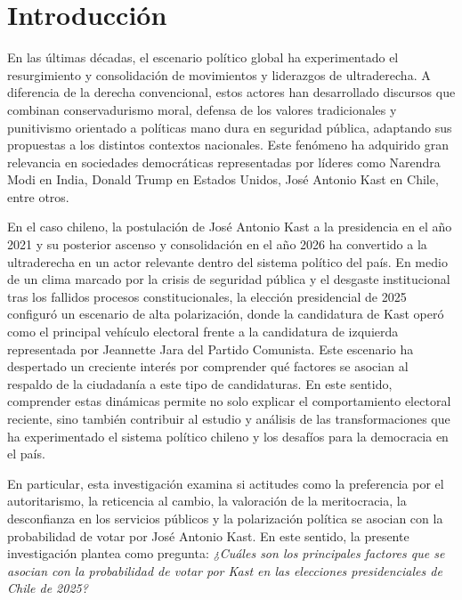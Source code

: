 \documentclass[
  spanish,
  a4paper,
  oneside]{scrbook}
\begin{document}

\chapter{Introducción}\label{introducciuxf3n}

En las últimas décadas, el escenario político global ha experimentado el
resurgimiento y consolidación de movimientos y liderazgos de
ultraderecha. A diferencia de la derecha convencional, estos actores han
desarrollado discursos que combinan conservadurismo moral, defensa de
los valores tradicionales y punitivismo orientado a políticas mano dura
en seguridad pública, adaptando sus propuestas a los distintos contextos
nacionales. Este fenómeno ha adquirido gran relevancia en sociedades
democráticas representadas por líderes como Narendra Modi en India,
Donald Trump en Estados Unidos, José Antonio Kast en Chile, entre otros.

En el caso chileno, la postulación de José Antonio Kast a la presidencia
en el año 2021 y su posterior ascenso y consolidación en el año 2026 ha
convertido a la ultraderecha en un actor relevante dentro del sistema
político del país. En medio de un clima marcado por la crisis de
seguridad pública y el desgaste institucional tras los fallidos procesos
constitucionales, la elección presidencial de 2025 configuró un
escenario de alta polarización, donde la candidatura de Kast operó como
el principal vehículo electoral frente a la candidatura de izquierda
representada por Jeannette Jara del Partido Comunista. Este escenario ha
despertado un creciente interés por comprender qué factores se asocian
al respaldo de la ciudadanía a este tipo de candidaturas. En este
sentido, comprender estas dinámicas permite no solo explicar el
comportamiento electoral reciente, sino también contribuir al estudio y
análisis de las transformaciones que ha experimentado el sistema
político chileno y los desafíos para la democracia en el país.

En particular, esta investigación examina si actitudes como la
preferencia por el autoritarismo, la reticencia al cambio, la valoración
de la meritocracia, la desconfianza en los servicios públicos y la
polarización política se asocian con la probabilidad de votar por José
Antonio Kast. En este sentido, la presente investigación plantea como
pregunta: \emph{¿Cuáles son los principales factores que se asocian con
la probabilidad de votar por Kast en las elecciones presidenciales de
Chile de 2025?}
\end{document}
